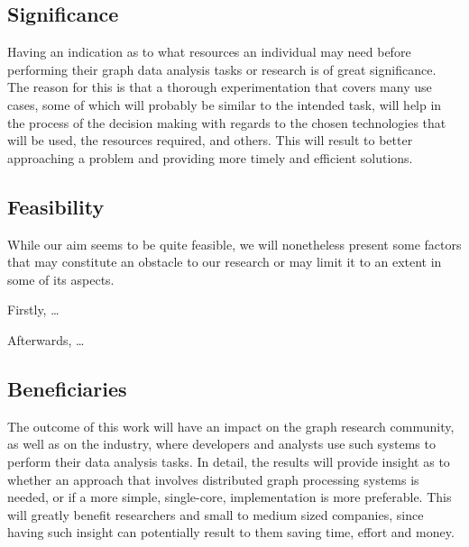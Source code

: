 \documentclass[a4paper,11pt]{article}
\begin{document}
\subsection{Significance}

Having an indication as to what resources an individual may need before performing their graph data analysis tasks or research is of great significance. The reason for this is that a thorough experimentation that covers many use cases, some of which will probably be similar to the intended task, will help in the process of the decision making with regards to the chosen technologies that will be used, the resources required, and others. This will result to better approaching a problem and providing more timely and efficient solutions.


\subsection{Feasibility}

\par While our aim seems to be quite feasible, we will nonetheless present some factors that may constitute an obstacle to our research or may limit it to an extent in some of its aspects.

\medskip

\par Firstly, \dots

\medskip

\par Afterwards, \dots




\subsection{Beneficiaries}

\par The outcome of this work will have an impact on the graph research community, as well as on the industry, where developers and analysts use such systems to perform their data analysis tasks. In detail, the results will provide insight as to whether an approach that involves distributed graph processing systems is needed, or if a more simple, single-core, implementation is more preferable. This will greatly benefit researchers and small to medium sized companies, since having such insight can potentially result to them saving time, effort and money.
\end{document}
